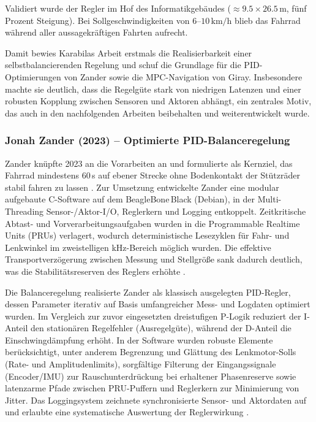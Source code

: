   Validiert wurde der Regler im Hof des Informatikgebäudes ($\approx 9.5\times26.5\,\text{m}$, fünf 
  Prozent Steigung). Bei Sollgeschwindigkeiten von $6$–$10\,\mathrm{km/h}$ blieb das Fahrrad während 
  aller aussagekräftigen Fahrten aufrecht. 
  
  Damit bewies Karabilas Arbeit erstmals die Realisierbarkeit einer selbstbalancierenden 
  Regelung und schuf die Grundlage für die PID-Optimierungen von Zander sowie die MPC-Navigation von Giray. 
  Insbesondere machte sie deutlich, dass die Regelgüte stark von niedrigen Latenzen und einer robusten 
  Kopplung zwischen Sensoren und Aktoren abhängt, ein zentrales Motiv, das auch in den nachfolgenden Arbeiten 
  beibehalten und weiterentwickelt wurde.
  

\subsubsection{Jonah Zander (2023) – Optimierte PID-Balanceregelung}

Zander knüpfte 2023 an die Vorarbeiten an und formulierte als Kernziel, das Fahrrad mindestens 60\,s auf 
ebener Strecke ohne Bodenkontakt der Stützräder stabil fahren zu lassen \citep{zander2023}. Zur Umsetzung entwickelte 
Zander eine modular aufgebaute C-Software auf dem BeagleBone\,Black (Debian), 
in der Multi-Threading Sensor-/Aktor-I/O, Reglerkern und Logging entkoppelt. Zeitkritische Abtast- und 
Vorverarbeitungsaufgaben wurden in die Programmable Realtime Units (PRUs) verlagert, wodurch deterministische 
Lesezyklen für Fahr- und Lenkwinkel im zweistelligen kHz-Bereich möglich wurden. Die effektive Transportverzögerung 
zwischen Messung und Stellgröße sank dadurch deutlich, was die Stabilitätsreserven des Reglers erhöhte \citep{zander2023}.

Die Balanceregelung realisierte Zander als klassisch ausgelegten PID-Regler, dessen Parameter iterativ auf 
Basis umfangreicher Mess- und Logdaten optimiert wurden. Im Vergleich zur zuvor eingesetzten dreistufigen P-Logik \citep{karabila2022} 
reduziert der I-Anteil den stationären Regelfehler (Ausregelgüte), während der D-Anteil die Einschwingdämpfung erhöht. In der Software wurden robuste 
Elemente berücksichtigt, unter anderem Begrenzung und Glättung des Lenkmotor-Solls (Rate- und Amplitudenlimits), 
sorgfältige Filterung der Eingangssignale (Encoder/IMU) zur Rauschunterdrückung bei erhaltener Phasenreserve 
sowie latenzarme Pfade zwischen PRU-Puffern und Reglerkern zur Minimierung von Jitter. Das Loggingsystem 
zeichnete synchronisierte Sensor- und Aktordaten auf und erlaubte eine systematische 
Auswertung der Reglerwirkung \citep{zander2023}.

